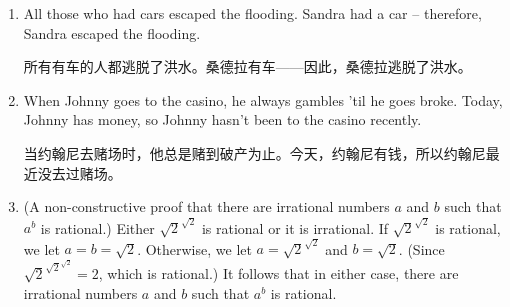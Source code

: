 \begin{enumerate}
\begin{enumerate}
{    This is ``disjunctive syllogism.''
    
    这是“选言三段论”。
    }
    
    \wbvfill
    
    \item \rule{0pt}{24pt} All those who had cars escaped the flooding.
    Sandra had a car -- therefore, Sandra
    escaped the flooding.
    
    所有有车的人都逃脱了洪水。桑德拉有车——因此，桑德拉逃脱了洪水。
    
    
    \wbvfill
    
    \item \rule{0pt}{24pt}  When Johnny goes to the casino, he always gambles 'til he goes broke.
    Today, Johnny
    has money, so Johnny hasn't been to the casino recently.
    
    当约翰尼去赌场时，他总是赌到破产为止。今天，约翰尼有钱，所以约翰尼最近没去过赌场。
    \wbvfill
    
    \item \rule{0pt}{24pt} (A non-constructive proof that there are 
    irrational numbers $a$ and $b$ such that $a^b$ is rational.)  
    Either $\sqrt{2}^{\sqrt{2}}$ is rational or it is irrational.
    If $\sqrt{2}^{\sqrt{2}}$ is rational, we let $a=b=\sqrt{2}$.
    Otherwise, we let $a=\sqrt{2}^{\sqrt{2}}$ and $b=\sqrt{2}$.
    (Since $\sqrt{2}^{\sqrt{2}^{\sqrt{2}}} = 2$, which is rational.) It follows that in either case, there
    are irrational numbers $a$ and $b$ such that $a^b$ is rational.
    

\end{enumerate}
\end{enumerate}
